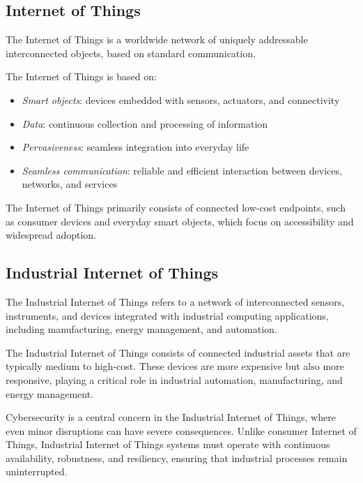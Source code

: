 \subsection{Internet of Things}
\begin{definition}
    The Internet of Things is a worldwide network of uniquely addressable interconnected objects, based on standard communication.
\end{definition}
\noindent The Internet of Things is based on: 
\begin{itemize}
    \item \textit{Smart objects}: devices embedded with sensors, actuators, and connectivity
    \item \textit{Data}: continuous collection and processing of information
    \item \textit{Pervasiveness}: seamless integration into everyday life
    \item \textit{Seamless communication}: reliable and efficient interaction between devices, networks, and services
\end{itemize}
The Internet of Things primarily consists of connected low-cost endpoints, such as consumer devices and everyday smart objects, which focus on accessibility and widespread adoption.

\subsection{Industrial Internet of Things}
\begin{definition}
    The Industrial Internet of Things refers to a network of interconnected sensors, instruments, and devices integrated with industrial computing applications, including manufacturing, energy management, and automation.
\end{definition}
The Industrial Internet of Things consists of connected industrial assets that are typically medium to high-cost. 
These devices are more expensive but also more responsive, playing a critical role in industrial automation, manufacturing, and energy management.

Cybersecurity is a central concern in the Industrial Internet of Things, where even minor disruptions can have severe consequences. 
Unlike consumer Internet of Things, Industrial Internet of Things systems must operate with continuous availability, robustness, and resiliency, ensuring that industrial processes remain uninterrupted.

